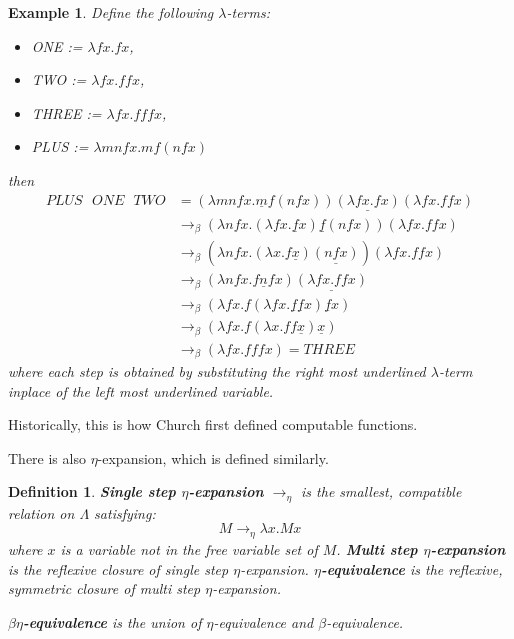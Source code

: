 \documentclass[english,letter paper,12pt,leqno]{article}
\newcommand{\lto}{\longrightarrow}
\newtheorem{defn}[theorem]{Definition}
\theoremstyle{example}
\newtheorem{example}[theorem]{Example}
\numberwithin{equation}{section}
\begin{document}
\begin{example}
	\label{plusonetwo}
	Define the following $\lambda$-terms:
	\begin{itemize}
		\item ONE := $\lambda f x . fx$,
		\item TWO := $\lambda f x . ffx$,
		\item THREE := $\lambda fx. fffx$,
		\item PLUS := $\lambda mnfx. mf(nfx)$
	\end{itemize}
	then
	\begin{align*}
		PLUS\text{ }ONE\text{ }TWO &= (\lambda mnfx. \underline{m}f(nfx))\underline{(\lambda f x . fx)}(\lambda f x . ffx)\\
		&\to_\beta (\lambda nfx. (\lambda f x . \underline{f}x)\underline{f}(nfx))(\lambda f x . ffx)\\
		&\to_\beta (\lambda nfx. (\lambda x . f\underline{x})\underline{(nfx)})(\lambda f x . ffx)\\
		&\to_\beta (\lambda nfx. f\underline{n}fx)\underline{(\lambda f x . ffx)}\\
		&\to_\beta (\lambda fx. f(\lambda f x . \underline{f}\underline{f}x)\underline{f}x)\\
		&\to_\beta (\lambda fx. f(\lambda  x . ff\underline{x})\underline{x})\\
		&\to_\beta (\lambda fx. fffx) = THREE
	\end{align*}
	where each step is obtained by substituting the right most underlined $\lambda$-term inplace of the left most underlined variable.
\end{example}
Historically, this is how Church first defined computable functions.

There is also $\eta$-expansion, which is defined similarly.

\begin{defn}\label{def:eta}
	\textbf{Single step $\eta$-expansion} $\lto_\eta$ is the smallest, compatible relation on $\Lambda$ satisfying:
	\begin{equation}
		M \lto_\eta \lambda x. Mx
	\end{equation}
	where $x$ is a variable not in the free variable set of $M$. \textbf{Multi step $\eta$-expansion} is the reflexive closure of single step $\eta$-expansion. \textbf{$\eta$-equivalence} is the reflexive, symmetric closure of multi step $\eta$-expansion.
	
	\textbf{$\beta\eta$-equivalence} is the union of $\eta$-equivalence and $\beta$-equivalence.
\end{defn}
\end{document}
